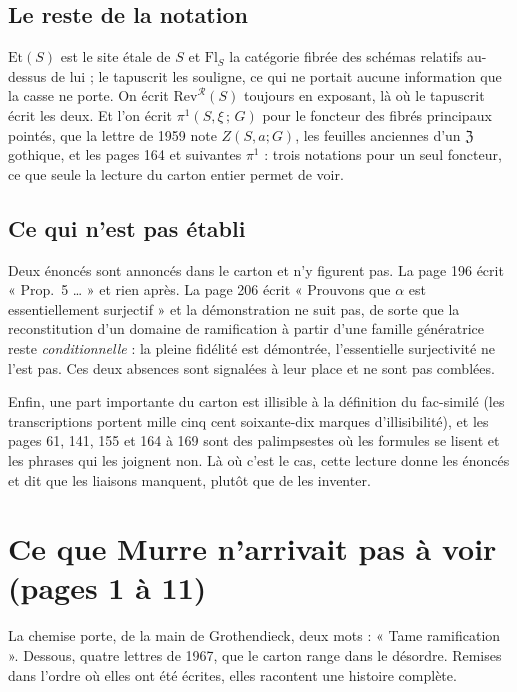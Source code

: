 \documentclass[11pt,a4paper]{article}
\begin{document}
\subsection*{Le reste de la notation}

$\mathrm{Et}(S)$ est le site étale de $S$ et $\mathrm{Fl}_S$ la catégorie
fibrée des schémas relatifs au-dessus de lui ; le tapuscrit les souligne, ce
qui ne portait aucune information que la casse ne porte. On écrit
$\mathrm{Rev}^{\mathcal{R}}(S)$ toujours en exposant, là où le tapuscrit écrit
les deux. Et l'on écrit $\pi^1(S, \xi\,;\, G)$ pour le foncteur des fibrés
principaux pointés, que la lettre de 1959 note $Z(S,a;G)$, les feuilles
anciennes d'un $\mathfrak{Z}$ gothique, et les pages 164 et
suivantes $\pi^1$ : trois notations pour un seul foncteur, ce que seule la
lecture du carton entier permet de voir.

\subsection*{Ce qui n'est pas établi}

Deux énoncés sont annoncés dans le carton et n'y figurent pas. La page 196
écrit « Prop.\ 5 … » et rien après. La page 206 écrit « Prouvons que
$\alpha$ est essentiellement surjectif » et la démonstration ne suit pas, de
sorte que la reconstitution d'un domaine de ramification à partir d'une famille
génératrice reste \emph{conditionnelle} : la pleine fidélité est démontrée,
l'essentielle surjectivité ne l'est pas. Ces deux absences sont signalées à
leur place et ne sont pas comblées.

Enfin, une part importante du carton est illisible à la définition du
fac-similé (les transcriptions portent mille cinq cent soixante-dix marques
d'illisibilité), et les pages 61, 141, 155 et 164 à 169 sont des palimpsestes
où les formules se lisent et les phrases qui les joignent non. Là où c'est le
cas, cette lecture donne les énoncés et dit que les liaisons manquent, plutôt
que de les inventer.

\section*{Ce que Murre n'arrivait pas à voir (pages 1 à 11)}

La chemise porte, de la main de Grothendieck, deux mots : « Tame
ramification ». Dessous, quatre lettres de 1967, que le carton range dans le
désordre. Remises dans l'ordre où elles ont été écrites, elles racontent une
histoire complète.
\end{document}
